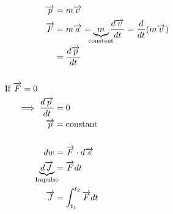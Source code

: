 \documentclass[12pt]{article}
\begin{document}
\begin{align*}
	\overrightarrow{p}                                                   & = m\overrightarrow{v}                                                                                                                          \\
	\overrightarrow{F}                                                   & = m\overrightarrow{a} = \underbrace{m}_\text{\hidewidth constant\hidewidth} \frac{d\overrightarrow{v}}{dt} = \frac{d}{dt}(m\overrightarrow{v}) \\
	                                                                     & = \frac{d\overrightarrow{p}}{dt}                                                                                                               \\
	\phantom{=}                                                                                                                                                                                                           \\
	\text{If } \overrightarrow{F} = 0 \qquad                             &                                                                                                                                                \\
	\implies \frac{d\overrightarrow{p}}{dt}                              & = 0                                                                                                                                            \\
	\overrightarrow{p}                                                   & = \text{constant}                                                                                                                              \\
	\phantom{=}                                                                                                                                                                                                           \\
	dw                                                                   & = \overrightarrow{F} \cdot d\overrightarrow{s}                                                                                                 \\
	\underbrace{d\overrightarrow{J}}_\text{\hidewidth Impulse\hidewidth} & = \overrightarrow{F} dt                                                                                                                        \\
	\overrightarrow{J}                                                   & = \int_{t_1}^{t_2} \overrightarrow{F} dt
\end{align*}
\end{document}
